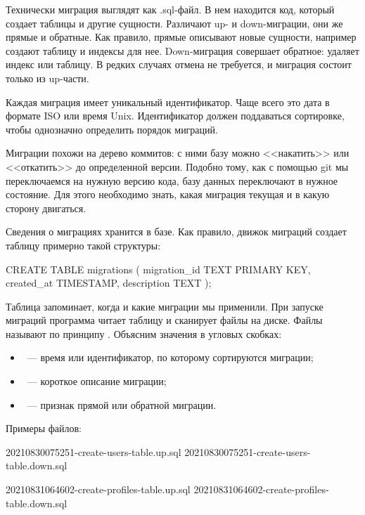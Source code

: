Технически миграция выглядят как .sql-файл. В нем находится код, который создает таблицы и другие сущности. Различают up- и down-миграции, они же прямые и обратные. Как правило, прямые описывают новые сущности, например создают таблицу и индексы для нее. Down-миграция совершает обратное: удаляет индекс или таблицу. В редких случаях отмена не требуется, и миграция состоит только из up-части.

Каждая миграция имеет уникальный идентификатор. Чаще всего это дата в формате ISO или время Unix. Идентификатор должен поддаваться сортировке, чтобы однозначно определить порядок миграций.

Миграции похожи на дерево коммитов: с ними базу можно <<накатить>> или <<откатить>> до определенной версии. Подобно тому, как с помощью git мы переключаемся на нужную версию кода, базу данных переключают в нужное состояние. Для этого необходимо знать, какая миграция текущая и в какую сторону двигаться.

Сведения о миграциях хранится в базе. Как правило, движок миграций создает таблицу  примерно такой структуры:

\begin{english}
  \begin{sql}
CREATE TABLE migrations (
  migration_id TEXT PRIMARY KEY,
  created_at TIMESTAMP,
  description TEXT
);
  \end{sql}
\end{english}

Таблица запоминает, когда и какие миграции мы применили. При запуске миграций программа читает таблицу и сканирует файлы на диске. Файлы называют по принципу . Объясним значения в угловых скобках:

\begin{itemize}

\item
  ~--- время или идентификатор, по которому сортируются миграции;

\item
  ~--- короткое описание миграции;

\item
  ~--- признак прямой или обратной миграции.

\end{itemize}

Примеры файлов:

\begin{english}
  \begin{text}
20210830075251-create-users-table.up.sql
20210830075251-create-users-table.down.sql

20210831064602-create-profiles-table.up.sql
20210831064602-create-profiles-table.down.sql
  \end{text}
\end{english}

